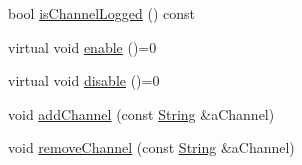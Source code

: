 \begin{DoxyCompactItemize}
\item 
bool \mbox{\hyperlink{classlibrary_1_1core_1_1logger_1_1sinks_1_1_sink_a708041f4c444c21ea1963bd0649b6ac5}{is\+Channel\+Logged}} () const
\item 
virtual void \mbox{\hyperlink{classlibrary_1_1core_1_1logger_1_1sinks_1_1_sink_aa41e2b1488d2e761ded1d209eacf02b3}{enable}} ()=0
\item 
virtual void \mbox{\hyperlink{classlibrary_1_1core_1_1logger_1_1sinks_1_1_sink_a3ab28f7a964d138fc9d080f026bb4143}{disable}} ()=0
\item 
void \mbox{\hyperlink{classlibrary_1_1core_1_1logger_1_1sinks_1_1_sink_a7905264ef5dde58d967fd7ebb011bdf9}{add\+Channel}} (const \mbox{\hyperlink{classlibrary_1_1core_1_1types_1_1_string}{String}} \&a\+Channel)
\item 
void \mbox{\hyperlink{classlibrary_1_1core_1_1logger_1_1sinks_1_1_sink_a5dd0f0385cd5ba7d281864ba6b8ff7a7}{remove\+Channel}} (const \mbox{\hyperlink{classlibrary_1_1core_1_1types_1_1_string}{String}} \&a\+Channel)
\end{DoxyCompactItemize}
